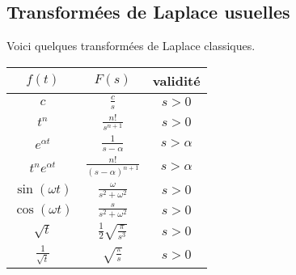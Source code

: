 \documentclass[class=report,crop=false]{standalone}
\begin{document}
\subsection{Transformées de Laplace usuelles}

Voici quelques transformées de Laplace classiques.

\begin{center}
\setlength{\arrayrulewidth}{0.05mm}
\begin{tabular}[t]{ccc@{\vrule depth 2.5ex height 3.5ex width 0mm \ }} 
  \quad $f(t)$ \qquad  & $F(s)$                        & validité \\ \hline\hline
   $c$                  & $\frac{c}{s}$                 & $s>0$ \\ \hline
   $t^n$                & $\frac{n!}{s^{n+1}}$          & $s>0$ \\ \hline
   $e^{\alpha t}$       & $\frac{1}{s-\alpha}$          & $s>\alpha$ \\ \hline
   $t^ne^{\alpha t}$    & $\frac{n!}{(s-\alpha)^{n+1}}$ & $s>\alpha$ \\ \hline 
   $\sin(\omega t)$     & $\frac{\omega}{s^2+\omega^2}$ & $s>0$ \\ \hline
   $\cos(\omega t)$     & $\frac{s}{s^2+\omega^2}$      & $s>0$ \\ \hline   
   $\sqrt t$            & $\frac12\sqrt{\frac{\pi}{s^3}}$ & $s>0$ \\ \hline
   $\frac{1}{\sqrt t}$  & $\sqrt{\frac{\pi}{s}}$        & $s>0$ \\    
\end{tabular} 
\end{center}
\end{document}
